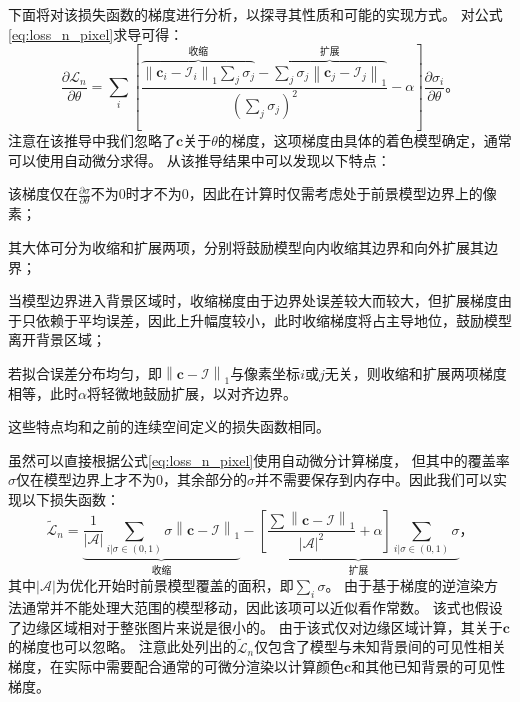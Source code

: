 下面将对该损失函数的梯度进行分析，以探寻其性质和可能的实现方式。
对公式\ref{eq:loss_n_pixel}求导可得：
\begin{equation}
\frac{\partial\mathcal{L}_n}{\partial\theta} =
\sum_{i}\left[
    \frac{
        \overbrace{\textstyle \left\| \mathbf{c}_i - \mathcal{I}_i \right\|_1 \sum_j\sigma_j}^\text{收缩} -
        \overbrace{\textstyle \sum_j \sigma_j \left\| \mathbf{c}_j - \mathcal{I}_j \right\|_1}^\text{扩展}
    }{\left(\sum_j\sigma_j\right)^2} - \alpha
\right]\frac{\partial\sigma_i}{\partial\theta}
\text{。}
\end{equation}
注意在该推导中我们忽略了$\mathbf{c}$关于$\theta$的梯度，这项梯度由具体的着色模型确定，通常可以使用自动微分求得。
从该推导结果中可以发现以下特点：
\begin{enumerate*}
    \item 该梯度仅在$\frac{\partial\sigma}{\partial\theta}$不为0时才不为0，因此在计算时仅需考虑处于前景模型边界上的像素；
    \item 其大体可分为收缩和扩展两项，分别将鼓励模型向内收缩其边界和向外扩展其边界；
    \item 当模型边界进入背景区域时，收缩梯度由于边界处误差较大而较大，但扩展梯度由于只依赖于平均误差，因此上升幅度较小，此时收缩梯度将占主导地位，鼓励模型离开背景区域；
    \item 若拟合误差分布均匀，即$\left\|\mathbf{c} - \mathcal{I}\right\|_1$与像素坐标$i$或$j$无关，则收缩和扩展两项梯度相等，此时$\alpha$将轻微地鼓励扩展，以对齐边界。
\end{enumerate*}
这些特点均和之前的连续空间定义的损失函数相同。

虽然可以直接根据公式\ref{eq:loss_n_pixel}使用自动微分计算梯度，
但其中的覆盖率$\sigma$仅在模型边界上才不为0，其余部分的$\sigma$并不需要保存到内存中。因此我们可以实现以下损失函数：
\begin{equation}
\tilde{\mathcal{L}}_n =
\underbrace{\frac{1}{|\mathcal{A}|}\sum_{i|\sigma\in(0,1)} \sigma\left\| \mathbf{c} - \mathcal{I} \right\|_1}_{\text{收缩}} -
\underbrace{\left[\frac{\sum\left\| \mathbf{c} - \mathcal{I} \right\|_1}{|\mathcal{A}|^2}+\alpha\right]\sum_{i|\sigma\in(0,1)} \sigma}_{\text{扩展}}
\text{，}
\label{eq:loss_n_tilde}
\end{equation}
其中$|\mathcal{A}|$为优化开始时前景模型覆盖的面积，即$\sum_{i} \sigma$。
由于基于梯度的逆渲染方法通常并不能处理大范围的模型移动，因此该项可以近似看作常数。
该式也假设了边缘区域相对于整张图片来说是很小的。
由于该式仅对边缘区域计算，其关于$\mathbf{c}$的梯度也可以忽略。
注意此处列出的$\tilde{\mathcal{L}}_n$仅包含了模型与未知背景间的可见性相关梯度，在实际中需要配合通常的可微分渲染以计算颜色$\mathbf{c}$和其他已知背景的可见性梯度。

